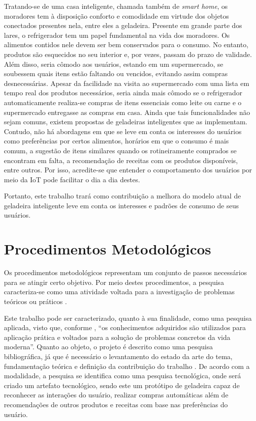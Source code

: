 Tratando-se de uma casa inteligente, chamada também de \textit{smart home}, os moradores tem à disposição conforto e comodidade em virtude dos objetos conectados presentes nela, entre eles a geladeira. Presente em grande parte dos lares, o refrigerador tem um papel fundamental na vida dos moradores. Os alimentos contidos nele devem ser bem conservados para o consumo. No entanto, produtos são esquecidos no seu interior e, por vezes, passam do prazo de validade. Além disso, seria cômodo aos usuários, estando em um supermercado, se soubessem quais itens estão faltando ou vencidos, evitando assim compras desnecessárias. Apesar da facilidade na visita ao supermercado com uma lista em tempo real dos produtos necessários, seria ainda mais cômodo se o refrigerador automaticamente realiza-se compras de itens essenciais como leite ou carne e o supermercado entregasse as compras em casa. Ainda que tais funcionalidades não sejam comuns, existem propostas de geladeiras inteligentes que as implementam. Contudo, não há abordagens em que se leve em conta os interesses do usuários como preferências por certos alimentos, horários em que o consumo é mais comum, a sugestão de itens similares quando os rotineiramente comprados se encontram em falta, a recomendação de receitas com os produtos disponíveis, entre outros. Por isso, acredite-se que entender o comportamento dos usuários por meio da IoT pode facilitar o dia a dia destes.

Portanto, este trabalho trará como contribuição a melhora do modelo atual de geladeira inteligente leve em conta os interesses e padrões de consumo de seus usuários.



\section{Procedimentos Metodológicos}

Os procedimentos metodológicos representam um conjunto de passos necessários para se atingir certo objetivo. Por meio destes procedimentos, a pesquisa caracteriza-se como uma atividade voltada para a investigação de problemas teóricos ou práticos \cite{Matias-Pereira2012}.

Este trabalho pode ser caracterizado, quanto à sua finalidade, como uma pesquisa aplicada, visto que, conforme , ``os conhecimentos adquiridos são utilizados para aplicação prática e voltados para a solução de problemas concretos da vida moderna''. Quanto ao objeto, o projeto é descrito como uma pesquisa bibliográfica, já que é necessário o levantamento do estado da arte do tema, fundamentação teórica e definição da contribuição do trabalho \cite{Matias-Pereira2012}. De acordo com a modalidade, a pesquisa se identifica como uma pesquisa tecnológica, onde será criado um artefato tecnológico, sendo este um protótipo de geladeira capaz de reconhecer as interações do usuário, realizar compras automáticas além de recomendações de outros produtos e receitas com base nas preferências do usuário. 

